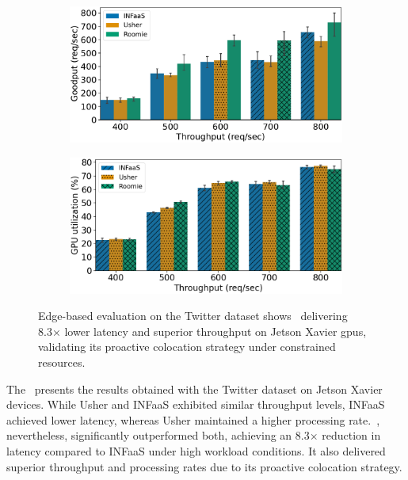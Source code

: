 \begin{figure}[h!]
	\begin{subfigure}[b]{0.45\textwidth}
		\centering
		\includegraphics[width=\textwidth]{chapters/roomie/images/JetsonNano/twitter-all-models/goodput.pdf}
	\end{subfigure}
	\hfill
	\begin{subfigure}[b]{0.45\textwidth}
		\centering
		\includegraphics[width=\textwidth]{chapters/roomie/images/JetsonNano/twitter-all-models/gpu_utilization.png}
	\end{subfigure}
	\caption{Edge-based evaluation on the Twitter dataset shows~\roomie{} delivering 8.3× lower latency and superior throughput on Jetson Xavier \acrshort{gpu}s, validating its proactive colocation strategy under constrained resources.}
	\label{fig:JetsonNano/twitter-all-models}
	\vspace{-3mm}
\end{figure}

The~ presents the results obtained with the Twitter dataset on Jetson Xavier devices. While Usher and INFaaS exhibited similar throughput levels, INFaaS achieved lower latency, whereas Usher maintained a higher processing rate.~\roomie, nevertheless, significantly outperformed both, achieving an 8.3× reduction in latency compared to INFaaS under high workload conditions. It also delivered superior throughput and processing rates due to its proactive colocation strategy.

